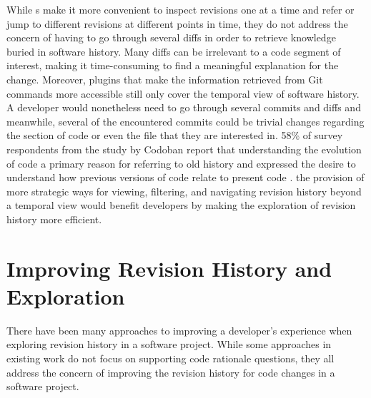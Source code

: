 While s make it more convenient to inspect revisions one at a time and refer 
or jump to different revisions at different points in time, they do not address the concern 
of having to go through several diffs
in order to retrieve knowledge buried in software history. 
Many diffs can be irrelevant to a code segment of interest, 
making it time-consuming to find a meaningful explanation for the change.
Moreover, plugins that make the information retrieved from Git commands more 
accessible still only cover the temporal view of software history.
A developer would nonetheless need to go through several commits and diffs and meanwhile, 
several of the encountered commits could be trivial changes regarding the section of code 
or even the file that they are interested in.
 58\% of survey respondents from the study by Codoban \etal report
that understanding the evolution of code  a primary reason for
referring to old history and expressed the desire to
understand how previous versions of code relate to present code \cite{codoban_software_2015}.
 the provision of more strategic ways for viewing, filtering, and 
navigating revision history beyond a temporal view would benefit developers by 
making the exploration of revision history more efficient.


\section{Improving Revision History and Exploration}

There have been many approaches to improving a developer's experience when exploring revision history in a software project. 
While some approaches in existing work do not focus on supporting code rationale questions, 
they all address the concern of improving the revision history for code changes in a software project.

